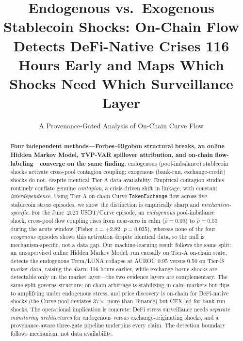 \documentclass[sigconf,anonymous]{acmart}
\begin{document}

\title{Endogenous vs.\ Exogenous Stablecoin Shocks: On-Chain Flow
Detects DeFi-Native Crises 116 Hours Early and Maps Which Shocks Need Which Surveillance Layer}
\subtitle{A Provenance-Gated Analysis of On-Chain Curve Flow}


\begin{abstract}
\textbf{Four independent methods---Forbes--Rigobon structural breaks, an online
Hidden Markov Model, TVP-VAR spillover attribution, and on-chain flow-labeling---converge
on the same finding}: endogenous (pool-imbalance) stablecoin shocks activate cross-pool
contagion coupling; exogenous (bank-run, exchange-credit) shocks do not, despite identical
Tier-A data availability. Empirical contagion studies routinely conflate genuine
\emph{contagion}, a crisis-driven shift in linkage, with constant \emph{interdependence}.
Using Tier-A on-chain Curve \texttt{TokenExchange} flow across five stablecoin stress
episodes, we show the distinction is empirically sharp and \emph{mechanism-specific}. For
the June~2023 USDT/Curve episode, an \emph{endogenous} pool-imbalance shock, cross-pool
flow coupling rises from near-zero in calm ($\hat{\rho}=0.09$) to $\hat{\rho}=0.53$ during
the acute window (Fisher $z=+2.82$, $p=0.035$), whereas none of the four \emph{exogenous}
episodes shows this activation despite identical data, so the null is mechanism-specific,
not a data gap. Our machine-learning result follows the same split: an
unsupervised online Hidden Markov Model, run causally on Tier-A on-chain state,
detects the endogenous Terra/LUNA collapse at AUROC $0.95$ versus $0.50$ on
Tier-B market data, raising the alarm 116 hours earlier, while exchange-borne
shocks are detectable only on the market layer---the two evidence layers are
complementary. The same split governs structure: on-chain arbitrage is
stabilizing in calm markets but flips to amplifying under endogenous stress, and
price discovery is on-chain for DeFi-native shocks (the Curve pool deviates
$37\times$ more than Binance) but CEX-led for bank-run shocks. The operational implication is concrete: DeFi stress
surveillance needs \emph{separate monitoring architectures} for endogenous
versus exchange-originating shocks, and a provenance-aware three-gate pipeline
underpins every claim. The detection boundary follows mechanism, not data availability.
\end{abstract}
\end{document}
